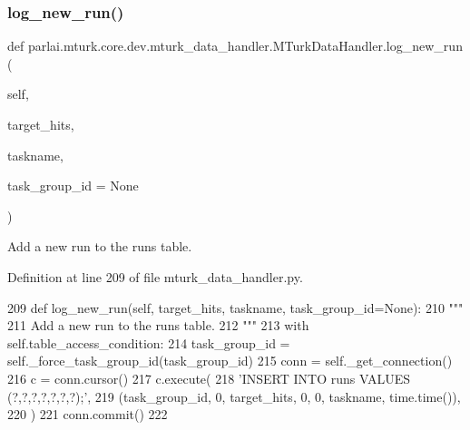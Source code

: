\subsubsection{\texorpdfstring{log\+\_\+new\+\_\+run()}{log\_new\_run()}}
{\footnotesize\ttfamily def parlai.\+mturk.\+core.\+dev.\+mturk\+\_\+data\+\_\+handler.\+M\+Turk\+Data\+Handler.\+log\+\_\+new\+\_\+run (\begin{DoxyParamCaption}\item[{}]{self,  }\item[{}]{target\+\_\+hits,  }\item[{}]{taskname,  }\item[{}]{task\+\_\+group\+\_\+id = {\ttfamily None} }\end{DoxyParamCaption})}

\begin{DoxyVerb}Add a new run to the runs table.
\end{DoxyVerb}
 

Definition at line 209 of file mturk\+\_\+data\+\_\+handler.\+py.


\begin{DoxyCode}
209     \textcolor{keyword}{def }log\_new\_run(self, target\_hits, taskname, task\_group\_id=None):
210         \textcolor{stringliteral}{"""}
211 \textcolor{stringliteral}{        Add a new run to the runs table.}
212 \textcolor{stringliteral}{        """}
213         with self.table\_access\_condition:
214             task\_group\_id = self.\_force\_task\_group\_id(task\_group\_id)
215             conn = self.\_get\_connection()
216             c = conn.cursor()
217             c.execute(
218                 \textcolor{stringliteral}{'INSERT INTO runs VALUES (?,?,?,?,?,?,?);'},
219                 (task\_group\_id, 0, target\_hits, 0, 0, taskname, time.time()),
220             )
221             conn.commit()
222 
\end{DoxyCode}
\mbox{\label{classparlai_1_1mturk_1_1core_1_1dev_1_1mturk__data__handler_1_1MTurkDataHandler_abf54a08cd2b503358c52229258c1f2c6}} 
